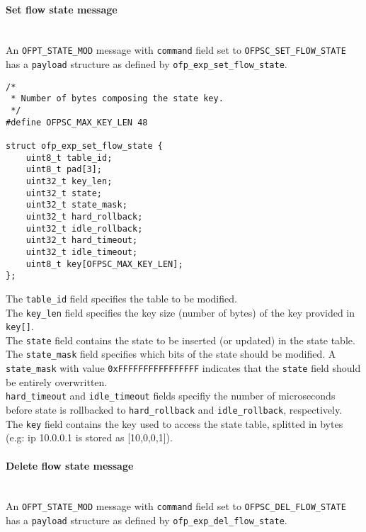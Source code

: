 
\paragraph{Set flow state message}\mbox{}\\
An \texttt{OFPT\_STATE\_MOD} message with \texttt{command} field set to \texttt{OFPSC\_SET\_FLOW\_STATE} has a \texttt{payload} structure as defined by \texttt{ofp\_exp\_set\_flow\_state}.

\scriptsize\begin{verbatim}
/*
 * Number of bytes composing the state key.
 */
#define OFPSC_MAX_KEY_LEN 48

struct ofp_exp_set_flow_state {
    uint8_t table_id;
    uint8_t pad[3];
    uint32_t key_len;
    uint32_t state;
    uint32_t state_mask;
    uint32_t hard_rollback;
    uint32_t idle_rollback;
    uint32_t hard_timeout;
    uint32_t idle_timeout;    
    uint8_t key[OFPSC_MAX_KEY_LEN];
};
\end{verbatim}\normalsize
The \texttt{table\_id} field specifies the table to be modified.
\\
The \texttt{key\_len} field specifies the key size (number of bytes) of the key provided in \texttt{key[]}.
\\
The \texttt{state} field contains the state to be inserted (or updated) in the state table. 
\\
The \texttt{state\_mask} field specifies which bits of the state should be modified. A \texttt{state\_mask} with value \texttt{0xFFFFFFFFFFFFFFFF} indicates that the \texttt{state} field should be entirely overwritten.
\\
\texttt{hard\_timeout} and \texttt{idle\_timeout} fields specifiy the number of microseconds before state is rollbacked to \texttt{hard\_rollback} and \texttt{idle\_rollback}, respectively.
\\
The \texttt{key} field contains the key used to access the state table, splitted in bytes (e.g: ip 10.0.0.1 is stored as [10,0,0,1]).

\paragraph{Delete flow state message}\mbox{}\\
An \texttt{OFPT\_STATE\_MOD} message with \texttt{command} field set to \texttt{OFPSC\_DEL\_FLOW\_STATE} has a \texttt{payload} structure as defined by \texttt{ofp\_exp\_del\_flow\_state}.

